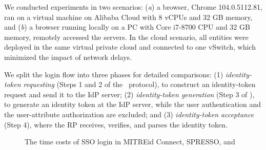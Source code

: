 We conducted experiments in two scenarios: (\emph{a}) a browser, Chrome 104.0.5112.81, ran on a virtual machine on Alibaba Cloud with 8 vCPUs and 32 GB memory, and (\emph{b}) a browser running locally on a PC with Core i7-8700 CPU and 32 GB memory, remotely accessed the servers.
In the cloud scenario, all entities were deployed in the same virtual private cloud and connected to one vSwitch, which minimized the impact of network delays.

 We split the login flow into three phases for detailed comparisons: (1)
{\em identity-token requesting} (Steps 1 and 2 of the \usso\ protocol), to construct an identity-token request and send it to the IdP server; (2) {\em identity-token generation} (Step 3 of \usso), to generate an identity token at the IdP server, while the user authentication and the user-attribute authorization are excluded; and (3) {\em identity-token acceptance} (Step 4), where the RP receives, verifies, and parses the identity token.

\begin{figure}[tb]
  \centering
  \caption{The time costs of SSO login in MITREid Connect, SPRESSO, and \usso}
  \label{fig:evaluation}
\end{figure}


